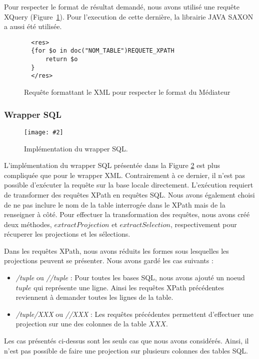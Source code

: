 \documentclass[a4paper,10pt]{article}
\newcommand{\fref}[1]{Figure~\ref{#1}}
\newcommand{\insertfigure}[4]{
\begin{figure}[ht!]
\begin{center}
\texttt{[image: \#2]}
\caption{#3}
\label{#4}
\end{center}
\end{figure}
}
\begin{document}
Pour respecter le format de résultat demandé, nous avons utilisé une requête XQuery (\fref{lst:format}). Pour l'execution de cette dernière, la librairie JAVA SAXON a aussi été utilisée. 

\begin{figure}[ht!]
\begin{verbatim}
  <res>
  {for $o in doc("NOM_TABLE")REQUETE_XPATH
      return $o
  }
  </res>
\end{verbatim}
\caption{Requête formattant le XML pour respecter le format du Médiateur}
\label{lst:format}
\end{figure}

\subsubsection{Wrapper SQL}

\insertfigure{1}{WrapperSQL.png}{Implémentation du wrapper SQL.}{fig:wrapperSQL}

L'implémentation du wrapper SQL présentée dans la Figure \ref{fig:wrapperSQL} est plus compliquée que pour le wrapper XML. Contrairement à ce dernier, il n'est pas possible d'exécuter la requête sur la base locale directement. L'exécution requiert de transformer des requêtes XPath en requêtes SQL. Nous avons également choisi de ne pas inclure le nom de la table interrogée dans le XPath mais de la renseigner à côté. Pour effectuer la transformation des requêtes, nous avons créé deux méthodes, \(extractProjection\) et \(extractSelection\), respectivement pour récuperer les projections et les sélections.


Dans les requêtes XPath, nous avons réduits les formes sous lesquelles les projections peuvent se présenter. Nous avons gardé les cas suivants :
\begin{itemize}
\item \emph{/tuple} ou \emph{//tuple} : Pour toutes les bases SQL, nous avons ajouté un noeud \(tuple\) qui représente une ligne. Ainsi les requêtes XPath précédentes reviennent à demander toutes les lignes de la table.
\item \emph{/tuple/XXX} ou \emph{//XXX} : Les requêtes précédentes permettent d'effectuer une projection sur une des colonnes de la table \(XXX\).
\end{itemize}
Les cas présentés ci-dessus sont les seuls cas que nous avons considérés. Ainsi, il n'est pas possible de faire une projection sur plusieurs colonnes des tables SQL.
\end{document}
